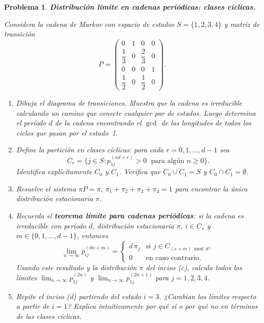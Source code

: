 \documentclass[12pt]{article}
\newtheorem{problem}{Problema}
\begin{document}
\begin{problem}
\textbf{Distribución límite en cadenas periódicas: clases cíclicas.}

Considera la cadena de Markov con espacio de estados $S = \{1, 2, 3, 4\}$ y matriz de transición
\[
P = \begin{pmatrix}
0 & 1 & 0 & 0 \\[4pt]
\dfrac{1}{3} & 0 & \dfrac{2}{3} & 0 \\[6pt]
0 & 0 & 0 & 1 \\[4pt]
\dfrac{1}{2} & 0 & \dfrac{1}{2} & 0
\end{pmatrix}.
\]

\begin{enumerate}
    \item[(a)] Dibuja el diagrama de transiciones. Muestra que la cadena es irreducible calculando un camino que conecte cualquier par de estados. Luego determina el período $d$ de la cadena encontrando el $\gcd$ de las longitudes de todos los ciclos que pasan por el estado~1.

    \item[(b)] Define la partición en clases cíclicas: para cada $r = 0, 1, \ldots, d-1$ sea
    \[
        C_r = \bigl\{j \in S : p_{1j}^{(nd+r)} > 0 \;\text{ para algún } n \ge 0\bigr\}.
    \]
    Identifica explícitamente $C_0$ y $C_1$. Verifica que $C_0 \cup C_1 = S$ y $C_0 \cap C_1 = \emptyset$.

    \item[(c)] Resuelve el sistema $\pi P = \pi$, $\pi_1 + \pi_2 + \pi_3 + \pi_4 = 1$ para encontrar la única distribución estacionaria $\pi$.

    \item[(d)] Recuerda el \textbf{teorema límite para cadenas periódicas}: si la cadena es irreducible con período $d$, distribución estacionaria $\pi$, $i \in C_s$ y $m \in \{0, 1, \ldots, d-1\}$, entonces
    \[
        \lim_{n \to \infty} p_{ij}^{(dn + m)} =
        \begin{cases}
            d\,\pi_j & \text{si } j \in C_{(s+m) \bmod d}, \\
            0        & \text{en caso contrario.}
        \end{cases}
    \]
    Usando este resultado y la distribución $\pi$ del inciso (c), calcula todos los límites $\lim_{n\to\infty}p_{1j}^{(2n)}$ y $\lim_{n\to\infty}p_{1j}^{(2n+1)}$ para $j = 1,2,3,4$.

    \item[(e)] Repite el inciso (d) partiendo del estado $i = 3$. ¿Cambian los límites respecto a partir de $i=1$? Explica intuitivamente por qué sí o por qué no en términos de las clases cíclicas.


\end{enumerate}
\end{problem}
\end{document}
